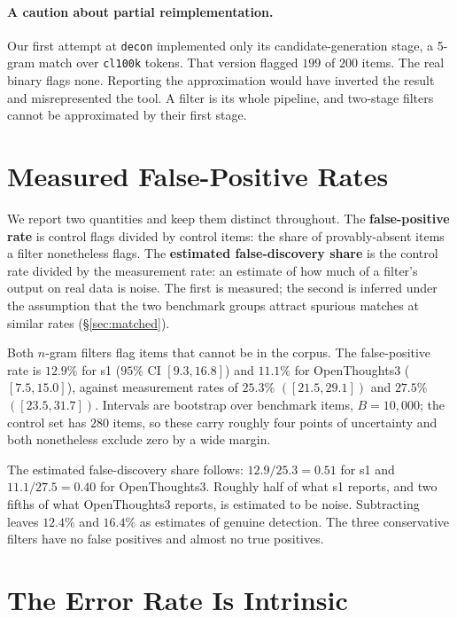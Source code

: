\documentclass[11pt]{article}
\begin{document}
\paragraph{A caution about partial reimplementation.}
Our first attempt at \texttt{decon} implemented only its candidate-generation
stage, a 5-gram match over \texttt{cl100k} tokens. That version flagged $199$ of
$200$ items. The real binary flags none. Reporting the approximation would have
inverted the result and misrepresented the tool. A filter is its whole pipeline,
and two-stage filters cannot be approximated by their first stage.

\section{Measured False-Positive Rates}
\label{sec:fpr}

We report two quantities and keep them distinct throughout. The
\textbf{false-positive rate} is control flags divided by control items: the share
of provably-absent items a filter nonetheless flags. The \textbf{estimated
false-discovery share} is the control rate divided by the measurement rate: an
estimate of how much of a filter's output on real data is noise. The first is
measured; the second is inferred under the assumption that the two benchmark
groups attract spurious matches at similar rates (\S\ref{sec:matched}).

Both $n$-gram filters flag items that cannot be in the corpus. The false-positive
rate is $12.9\%$ for s1 ($95\%$ CI $[9.3, 16.8]$) and $11.1\%$ for OpenThoughts3
($[7.5, 15.0]$), against measurement rates of $25.3\%$ $([21.5, 29.1])$ and
$27.5\%$ $([23.5, 31.7])$. Intervals are bootstrap over benchmark items,
$B{=}10{,}000$; the control set has $280$ items, so these carry roughly four
points of uncertainty and both nonetheless exclude zero by a wide margin.

The estimated false-discovery share follows: $12.9/25.3 = 0.51$ for s1 and
$11.1/27.5 = 0.40$ for OpenThoughts3. Roughly half of what s1 reports, and two
fifths of what OpenThoughts3 reports, is estimated to be noise. Subtracting leaves
$12.4\%$ and $16.4\%$ as estimates of genuine detection. The three conservative
filters have no false positives and almost no true positives.

\section{The Error Rate Is Intrinsic}
\label{sec:scale}
\end{document}
